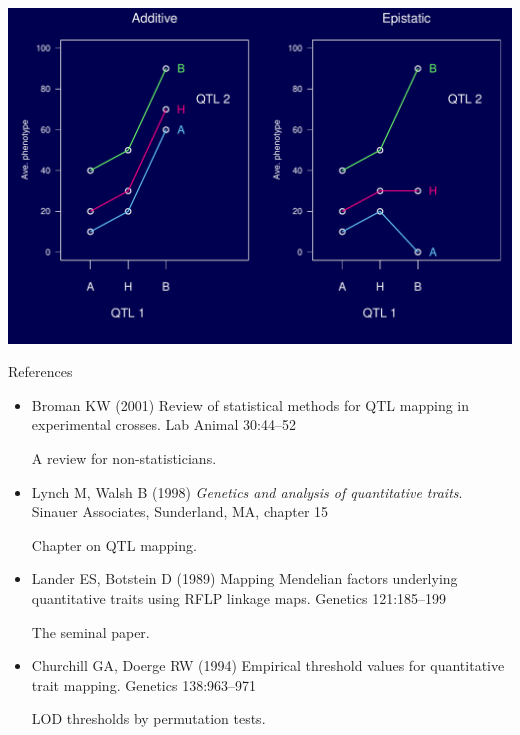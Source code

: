 \documentclass[12pt]{article}
\newcommand{\headsize}{\fontsize{35}{35} \selectfont}
\newcommand{\smallestsize}{\fontsize{18}{22} \selectfont}
\begin{document}
\vfill

\centerline{\includegraphics{Figs/epistasis_f2.pdf}}



\newpage

\headsize \color{myyellow}
\hfill \begin{minipage}{5.75in}
\centering
References
\end{minipage}

\vspace{15mm}

\color{mywhite} \smallestsize

\hspace*{0.5in}
\begin{minipage}{9.5in}
\begin{itemize}
\itemsep12pt
\item Broman KW (2001) Review of statistical methods for QTL mapping in
experimental crosses. Lab Animal 30:44--52

{\color{myblue} A review for non-statisticians.}

\item Lynch M, Walsh B (1998) \emph{Genetics and analysis of quantitative
traits}. Sinauer Associates, Sunderland, MA, chapter 15

{\color{myblue} Chapter on QTL mapping.}

\item Lander ES, Botstein D (1989) Mapping Mendelian factors underlying
quantitative traits using RFLP linkage maps. Genetics
121:185--199

{\color{myblue} The seminal paper.}

\item Churchill GA, Doerge RW (1994) Empirical threshold values for
quantitative trait mapping. Genetics 138:963--971

{\color{myblue} LOD thresholds by permutation tests.}

\end{itemize}
\end{minipage}
\end{document}

